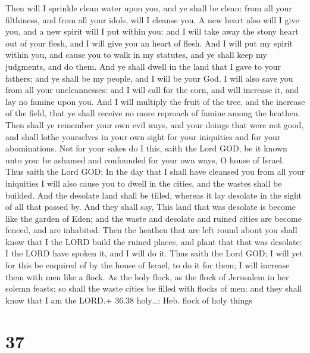 Then will I sprinkle clean water upon you, and ye shall
be clean: from all your filthiness, and from all your idols, will I
cleanse you.  A new heart also will I give you, and a new
spirit will I put within you: and I will take away the stony heart out
of your flesh, and I will give you an heart of flesh.  And
I will put my spirit within you, and cause you to walk in my statutes,
and ye shall keep my judgments, and do them.  And ye shall
dwell in the land that I gave to your fathers; and ye shall be my
people, and I will be your God.  I will also save you from
all your uncleannesses: and I will call for the corn, and will increase
it, and lay no famine upon you.  And I will multiply the
fruit of the tree, and the increase of the field, that ye shall receive
no more reproach of famine among the heathen.  Then shall
ye remember your own evil ways, and your doings that were not good, and
shall lothe yourselves in your own sight for your iniquities and for
your abominations.  Not for your sakes do I this, saith the
Lord GOD, be it known unto you: be ashamed and confounded for your own
ways, O house of Israel.  Thus saith the Lord GOD; In the
day that I shall have cleansed you from all your iniquities I will also
cause you to dwell in the cities, and the wastes shall be builded.
 And the desolate land shall be tilled, whereas it lay
desolate in the sight of all that passed by.  And they
shall say, This land that was desolate is become like the garden of
Eden; and the waste and desolate and ruined cities are become fenced,
and are inhabited.  Then the heathen that are left round
about you shall know that I the LORD build the ruined places, and plant
that that was desolate: I the LORD have spoken it, and I will do it.
 Thus saith the Lord GOD; I will yet for this be enquired
of by the house of Israel, to do it for them; I will increase them with
men like a flock.  As the holy flock, as the flock of
Jerusalem in her solemn feasts; so shall the waste cities be filled with
flocks of men: and they shall know that I am the LORD.+ 36.38
holy\ldots: Heb. flock of holy things

\hypertarget{section-36}{%
\section{37}\label{section-36}}

